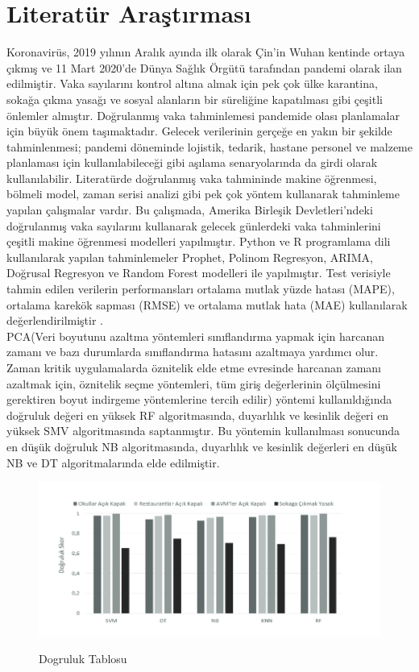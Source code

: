 \documentclass[12pt, a4paper]{article}
\begin{document}
\section{Literatür Araştırması}
Koronavirüs, 2019 yılının Aralık ayında ilk olarak Çin’in Wuhan kentinde ortaya çıkmış ve 11 Mart 2020’de Dünya Sağlık Örgütü tarafından pandemi olarak ilan edilmiştir. Vaka sayılarını kontrol altına almak için pek çok ülke karantina, sokağa çıkma yasağı ve sosyal alanların bir süreliğine kapatılması gibi çeşitli önlemler almıştır. Doğrulanmış vaka tahminlemesi pandemide olası planlamalar için büyük önem taşımaktadır. Gelecek verilerinin gerçeğe en yakın bir şekilde tahminlenmesi; pandemi döneminde lojistik, tedarik, hastane personel ve malzeme planlaması için kullanılabileceği gibi aşılama senaryolarında da girdi olarak kullanılabilir. Literatürde doğrulanmış vaka tahmininde makine öğrenmesi, bölmeli model, zaman serisi analizi gibi pek çok yöntem kullanarak tahminleme yapılan çalışmalar vardır. Bu çalışmada, Amerika Birleşik Devletleri’ndeki doğrulanmış vaka sayılarını kullanarak gelecek günlerdeki vaka tahminlerini çeşitli makine öğrenmesi modelleri yapılmıştır. Python ve R programlama dili kullanılarak yapılan tahminlemeler Prophet, Polinom Regresyon, ARIMA, Doğrusal Regresyon ve Random Forest modelleri ile yapılmıştır. Test verisiyle tahmin edilen verilerin performansları ortalama mutlak yüzde hatası (MAPE), ortalama karekök sapması (RMSE) ve ortalama mutlak hata (MAE) kullanılarak değerlendirilmiştir  \cite{article_855113}.\\ 
PCA(Veri boyutunu azaltma yöntemleri sınıflandırma yapmak için
harcanan zamanı ve bazı durumlarda sınıflandırma hatasını
azaltmaya yardımcı olur. Zaman kritik
uygulamalarda öznitelik elde etme evresinde harcanan zamanı
azaltmak için, öznitelik seçme yöntemleri, tüm giriş
değerlerinin ölçülmesini gerektiren boyut indirgeme
yöntemlerine tercih edilir\cite{genc2007new}) yöntemi kullanıldığında doğruluk değeri en yüksek RF algoritmasında,
duyarlılık ve kesinlik değeri en yüksek SMV algoritmasında saptanmıştır. Bu
yöntemin kullanılması sonucunda en düşük doğruluk NB algoritmasında,
duyarlılık ve kesinlik değerleri en düşük NB ve DT algoritmalarında elde
edilmiştir\cite{article_1031070}.
\begin{figure}[!htbp] 
	\caption{Dogruluk Tablosu}
	\centering
	\includegraphics[angle=0, width=\textwidth]{dogruluk.png}
	\label{dogruluk}
\end{figure}
\newpage
\end{document}
